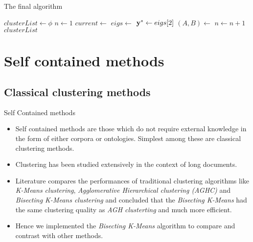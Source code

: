 \documentclass{beamer}
\begin{document}
\begin{frame}[fragile]{The final algorithm}

\begin{algorithm}[H]
\begin{algorithmic}[1]
   \State $clusterList \gets \phi$
   \State {}
   \State $n \gets 1$ 
       \State $current \gets $ 
       \State $eigs \gets $ 
       \State ${\bf y}^* \gets eigs[2]$ 
       \State $(A,B) \gets $ 
       \State {}
       \State {}
       \State {}
       \State $n \gets n + 1$
   \EndWhile
   \State \Return $clusterList$
\EndFunction
\end{algorithmic}
\end{algorithm}

\end{frame}


\section{Self contained methods}
\subsection{Classical clustering methods}
\begin{frame}{Self Contained methods}
\begin{itemize}
  \item Self contained methods are those which do not require external
    knowledge in the form of either corpora or ontologies. Simplest
    among these are classical clustering methods.
  \item Clustering has been studied extensively in the context of long
    documents. 
  \item Literature compares the performances of traditional
    clustering algorithms like {\it K-Means clustering}, {\it
      Agglomerative Hierarchical clustering (AGHC)} and {\it Bisecting
      K-Means clustering} and concluded that the {\it Bisecting
      K-Means} had the same clustering quality as {\it AGH
      clusterting} and much more efficient. 
  \item Hence we implemented the {\it Bisecting K-Means}
    algorithm to compare and contrast with other methods.
\end{itemize}
\end{frame}
\end{document}
